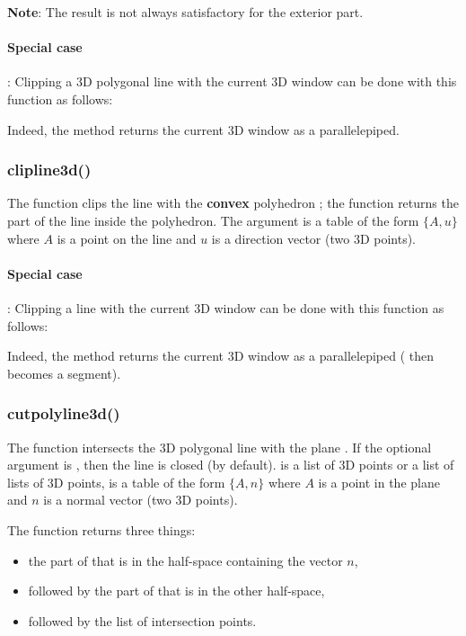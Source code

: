 \textbf{Note}: The result is not always satisfactory for the exterior part.

\paragraph{Special case}: Clipping a 3D polygonal line  with the current 3D window can be done with this function as follows:

Indeed, the  method returns the current 3D window as a parallelepiped.

\subsubsection{clipline3d()}

The function  clips the line  with the \textbf{convex} polyhedron ; the function returns the part of the line inside the polyhedron. The argument  is a table of the form $\{A,u\}$ where $A$ is a point on the line and $u$ is a direction vector (two 3D points).

\paragraph{Special case}: Clipping a line  with the current 3D window can be done with this function as follows:

Indeed, the  method returns the current 3D window as a parallelepiped ( then becomes a segment).

\subsubsection{cutpolyline3d()}

The function  intersects the 3D polygonal line  with the plane . If the optional argument  is \true, then the line is closed (\false by default).  is a list of 3D points or a list of lists of 3D points,  is a table of the form $\{A,n\}$ where $A$ is a point in the plane and $n$ is a normal vector (two 3D points).

The function returns three things:
\begin{itemize}
\item the part of  that is in the half-space containing the vector $n$,
\item followed by the part of  that is in the other half-space,
\item followed by the list of intersection points.
\end{itemize}

